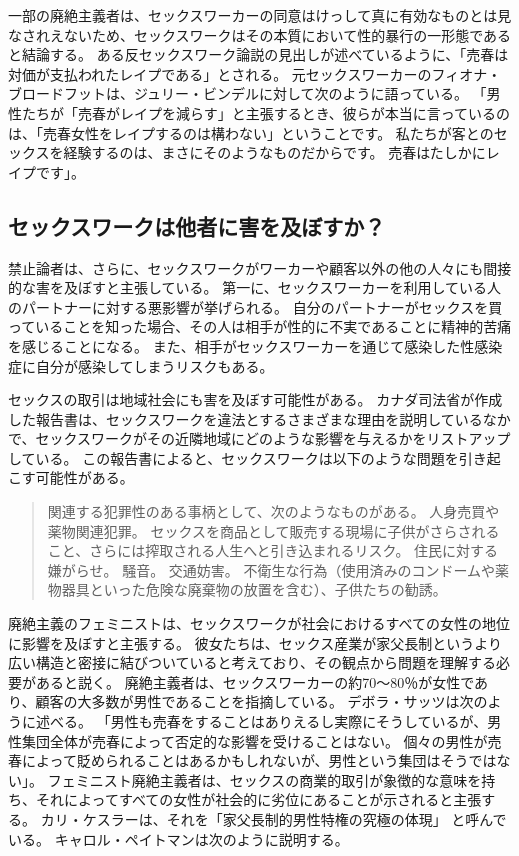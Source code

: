 \documentclass[paper=a4,book,openany]{jlreq}
\begin{document}
一部の廃絶主義者は、セックスワーカーの同意はけっして真に有効なものとは見なされえないため、セックスワークはその本質において性的暴行の一形態であると結論する。
ある反セックスワーク論説の見出しが述べているように、「売春は対価が支払われたレイプである」とされる\citep{raymond95:_prost_is_rape_thats_paid}。
元セックスワーカーのフィオナ・ブロードフットは、ジュリー・ビンデルに対して次のように語っている。
「男性たちが「売春がレイプを減らす」と主張するとき、彼らが本当に言っているのは、「売春女性をレイプするのは構わない」ということです。
私たちが客とのセックスを経験するのは、まさにそのようなものだからです。
売春はたしかにレイプです」\citep{bindel19:_real_face_prost}。

\subsection{セックスワークは他者に害を及ぼすか？}

禁止論者は、さらに、セックスワークがワーカーや顧客以外の他の人々にも間接的な害を及ぼすと主張している。
第一に、セックスワーカーを利用している人のパートナーに対する悪影響が挙げられる。
自分のパートナーがセックスを買っていることを知った場合、その人は相手が性的に不実であることに精神的苦痛を感じることになる。
また、相手がセックスワーカーを通じて感染した性感染症に自分が感染してしまうリスクもある。

セックスの取引は地域社会にも害を及ぼす可能性がある。
カナダ司法省が作成した報告書は、セックスワークを違法とするさまざまな理由を説明しているなかで、セックスワークがその近隣地域にどのような影響を与えるかをリストアップしている。
この報告書によると、セックスワークは以下のような問題を引き起こす可能性がある。

\begin{quote}
関連する犯罪性のある事柄として、次のようなものがある。
人身売買や薬物関連犯罪。
セックスを商品として販売する現場に子供がさらされること、さらには搾取される人生へと引き込まれるリスク。
住民に対する嫌がらせ。
騒音。
交通妨害。
不衛生な行為（使用済みのコンドームや薬物器具といった危険な廃棄物の放置を含む）、子供たちの勧誘。
\citep{department14:_techn_paper}
\end{quote}

廃絶主義のフェミニストは、セックスワークが社会におけるすべての女性の地位に影響を及ぼすと主張する。
彼女たちは、セックス産業が家父長制というより広い構造と密接に結びついていると考えており、その観点から問題を理解する必要があると説く。
廃絶主義者は、セックスワーカーの約70～80％が女性であり、顧客の大多数が男性であることを指摘している。
デボラ・サッツは次のように述べる。
「男性も売春をすることはありえるし実際にそうしているが、男性集団全体が売春によって否定的な影響を受けることはない。
個々の男性が売春によって貶められることはあるかもしれないが、男性という集団はそうではない」\citep[p.149]{satz95:_market_women_sexual_labor}。
フェミニスト廃絶主義者は、セックスの商業的取引が象徴的な意味を持ち、それによってすべての女性が社会的に劣位にあることが示されると主張する。
カリ・ケスラーは、それを「家父長制的男性特権の究極の体現」 と呼んでいる\citep[p.19]{kesler02:_is_femin_stanc_suppor_prost_possib}。
キャロル・ペイトマンは次のように説明する。
\end{document}
